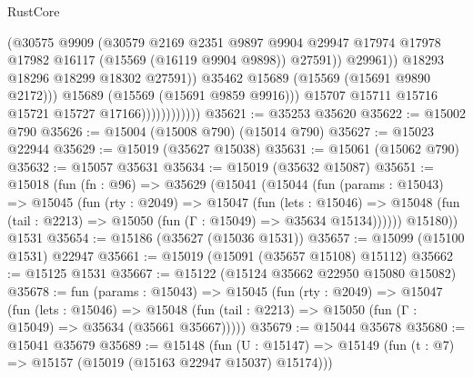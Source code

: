 \begin{lexlean}{RustCore}
\begin{coremodule}
                                        (@30575
                                          @9909
                                          (@30579
                                            @2169
                                            @2351
                                            @9897
                                            @9904
                                            @29947
                                            @17974
                                            @17978
                                            @17982
                                            @16117
                                            (@15569 (@16119 @9904 @9898))
                                            @27591))
                                        @29961))
                                    @18293
                                    @18296
                                    @18299
                                    @18302
                                    @27591))
                                @35462
                                @15689
                                (@15569 (@15691 @9890 @2172)))
                              @15689
                              (@15569 (@15691 @9859 @9916)))
                            @15707
                            @15711
                            @15716
                            @15721
                            @15727
                            @17166))))))))))))
@35621 := @35253 @35620
@35622 := @15002 @790
@35626 := @15004 (@15008 @790) (@15014 @790)
@35627 := @15023 @22944
@35629 := @15019 (@35627 @15038)
@35631 := @15061 (@15062 @790)
@35632 := @15057 @35631
@35634 := @15019 (@35632 @15087)
@35651 := @15018
    (fun (fn : @96) =>
    @35629
      (@15041
        (@15044
          (fun (params : @15043) =>
          @15045
            (fun (rty : @2049) =>
            @15047
              (fun (lets : @15046) =>
              @15048 (fun (tail : @2213) => @15050 (fun (Γ : @15049) => @35634 @15134))))))
        @15180))
    @1531
@35654 := @15186 (@35627 (@15036 @1531))
@35657 := @15099 (@15100 @1531) @22947
@35661 := @15019 (@15091 (@35657 @15108) @15112)
@35662 := @15125 @1531
@35667 := @15122 (@15124 @35662 @22950 @15080 @15082)
@35678 := fun (params : @15043) =>
  @15045
    (fun (rty : @2049) =>
    @15047
      (fun (lets : @15046) =>
      @15048 (fun (tail : @2213) => @15050 (fun (Γ : @15049) => @35634 (@35661 @35667)))))
@35679 := @15044 @35678
@35680 := @15041 @35679
@35689 := @15148
    (fun (U : @15147) => @15149 (fun (t : @7) => @15157 (@15019 (@15163 @22947 @15037) @15174)))

\end{coremodule}
\end{lexlean}
